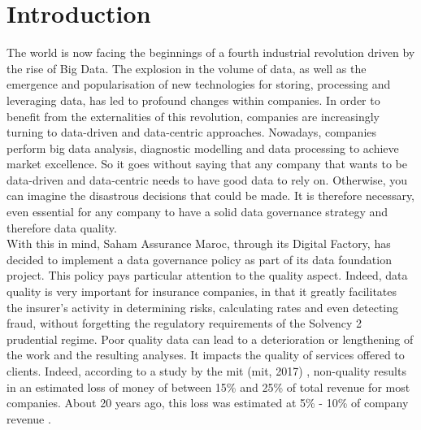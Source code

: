 \cleardoublepage
{}
{}
\vspace*{0.5cm}
\section*{\centering \Huge Introduction}
\titlerule[2.0pt]
\vspace{1cm}

The world is now facing the beginnings of a fourth industrial revolution driven by the rise of Big Data. The explosion in the volume of data, as well as the emergence and popularisation of new technologies for storing, processing and leveraging data, has led to profound changes within companies. In order to benefit from the externalities of this revolution, companies are increasingly turning to data-driven and data-centric approaches. Nowadays, companies perform big data analysis, diagnostic modelling and data processing to achieve market excellence. So it goes without saying that any company that wants to be data-driven and data-centric needs to have good data to rely on. Otherwise, you can imagine the disastrous decisions that could be made. It is therefore necessary, even essential for any company to have a solid data governance strategy and therefore data quality.\\

With this in mind, Saham Assurance Maroc, through its Digital Factory, has decided to implement a data governance policy as part of its data foundation project. This policy pays particular attention to the quality aspect. Indeed, data quality is very important for insurance companies, in that it greatly facilitates the insurer's activity in determining risks, calculating rates and even detecting fraud, without forgetting the regulatory requirements of the Solvency 2 prudential regime. Poor quality data can lead to a deterioration or lengthening of the work and the resulting analyses. It impacts the quality of services offered to clients. Indeed, according to a study by the \acrlong{mit} (\acrshort{mit}, 2017) \cite{MIT2017}, non-quality results in an estimated loss of money of between 15\% and 25\% of total revenue for most companies. About 20 years ago, this loss was estimated at 5\% - 10\% of company revenue \cite{Techno7}.\\


